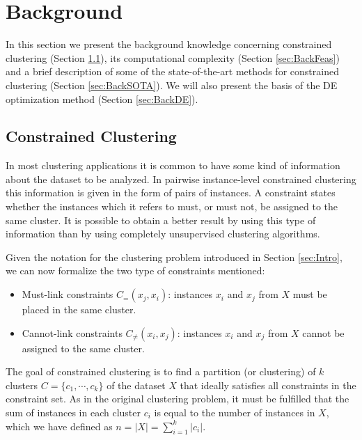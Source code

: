 \documentclass[review]{elsarticle}
\begin{document}
\section{Background} \label{sec:background}

In this section we present the background knowledge concerning constrained clustering (Section \ref{sec:BackCC}), its computational complexity (Section \ref{sec:BackFeas}) and a brief description of some of the state-of-the-art methods for constrained clustering (Section \ref{sec:BackSOTA}). We will also present the basis of the DE optimization method (Section \ref{sec:BackDE}).

\subsection{Constrained Clustering} \label{sec:BackCC}

In most clustering applications it is common to have some kind of information about the dataset to be analyzed. In pairwise instance-level constrained clustering this information is given in the form of pairs of instances. A constraint states whether the instances which it refers to must, or must not, be assigned to the same cluster. It is possible to obtain a better result by using this type of information than by using completely unsupervised clustering algorithms.

Given the notation for the clustering problem introduced in Section \ref{sec:Intro}, we can now formalize the two type of constraints mentioned: 

\begin{itemize}

	\item Must-link constraints $C_=(x_j,x_i)$: instances $x_i$ and $x_j$ from $X$ must be placed in the same cluster.

	\item Cannot-link constraints $C_{\neq}(x_i,x_j)$: instances $x_i$ and $x_j$ from $X$ cannot be assigned to the same cluster.

\end{itemize}

The goal of constrained clustering is to find a partition (or clustering) of $k$ clusters $C = \{c_1, \cdots, c_k\}$ of the dataset $X$ that ideally satisfies all constraints in the constraint set. As in the original clustering problem, it must be fulfilled that the sum of instances in each cluster $c_i$ is equal to the number of instances in $X$, which we have defined as $n = |X| = \sum_{i = 1}^{k} |c_i|$.
\end{document}
